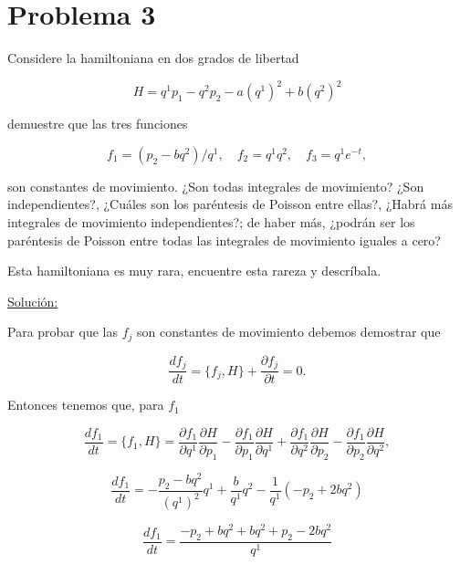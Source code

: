 \documentclass[a4paper,10pt]{article}
\numberwithin{equation}{section}
\begin{document}
\section{Problema 3}

Considere la hamiltoniana en dos grados de libertad 

$$
H = q^1p_1 - q^2p_2 - a(q^1)^2 + b(q^2)^2
$$

demuestre que las tres funciones 

$$
f_1 = (p_2 - bq^2)/q^1, \quad f_2 = q^1q^2, \quad f_3=q^1e^{-t},
$$

son constantes de movimiento. ¿Son todas integrales de movimiento? ¿Son independientes?, 
¿Cuáles son los paréntesis de Poisson entre ellas?, ¿Habrá más integrales de movimiento 
independientes?; de haber más, ¿podrán ser los paréntesis de Poisson entre todas 
las integrales de movimiento iguales a cero?

\vspace{.3cm}

Esta hamiltoniana es muy rara, encuentre esta rareza y descríbala.

\vspace{.3cm}

\underline{Solución:} \vspace{.3cm}

Para probar que las $f_j$ son constantes de movimiento debemos demostrar que 

\begin{equation}
 \frac{df_j}{dt} = \{f_j,H\} + \frac{\partial f_j}{\partial t} =  0.
\end{equation}

Entonces tenemos que, para $f_1$

\begin{equation}
 \frac{df_1}{dt} = \{f_1,H\} = \frac{\partial f_1}{\partial q^1}\frac{\partial H}{\partial p_1} - 
 \frac{\partial f_1}{\partial p_1}\frac{\partial H}{\partial q^1} +  \frac{\partial f_1}{\partial q^2}\frac{\partial H}{\partial p_2} - 
 \frac{\partial f_1}{\partial p_2}\frac{\partial H}{\partial q^2},
\end{equation}

\begin{equation}
 \frac{df_1}{dt} = - \frac{p_2 - bq^2}{(q^1)^2}q^1 + \frac{b}{q^1}q^2
 - \frac{1}{q^1}(-p_2 + 2bq^2)
\end{equation}

\begin{equation}
 \frac{df_1}{dt} = \frac{-p_2 + bq^2 + bq^2 + p_2 -2bq^2}{q^1} 
\end{equation}
\end{document}

